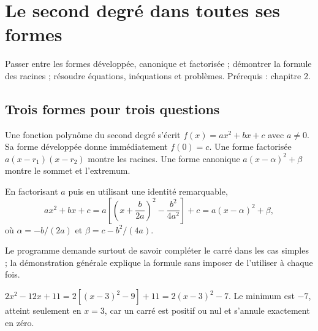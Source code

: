 \documentclass[../cours_1re.tex]{subfiles}
\begin{document}
\setcounter{chapter}{2}
\chapter{Le second degré dans toutes ses formes}
\label{ch:03}
\begin{objectif}
Passer entre les formes développée, canonique et factorisée ; démontrer la formule des racines ; résoudre équations, inéquations et problèmes. Prérequis : chapitre 2.
\end{objectif}
\section{Trois formes pour trois questions}
Une fonction polynôme du second degré s'écrit $f(x)=ax^2+bx+c$ avec $a\ne0$. Sa forme développée donne immédiatement $f(0)=c$. Une forme factorisée $a(x-r_1)(x-r_2)$ montre les racines. Une forme canonique $a(x-\alpha)^2+\beta$ montre le sommet et l'extremum.
\begin{demonstration}
En factorisant $a$ puis en utilisant une identité remarquable,
\[
ax^2+bx+c
=a\left[\left(x+\frac b{2a}\right)^2-\frac{b^2}{4a^2}\right]+c
=a(x-\alpha)^2+\beta,
\]
où $\alpha=-b/(2a)$ et $\beta=c-b^2/(4a)$.
\end{demonstration}
Le programme demande surtout de savoir compléter le carré dans les cas simples ; la démonstration générale explique la formule sans imposer de l'utiliser à chaque fois.
\begin{exemple}
$2x^2-12x+11=2[(x-3)^2-9]+11=2(x-3)^2-7$.
Le minimum est $-7$, atteint seulement en $x=3$, car un carré est positif ou nul et s'annule exactement en zéro.
\end{exemple}
\end{document}
